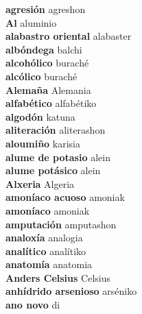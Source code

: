 \textbf{ agresión  } agreshon \\
\textbf{ Al  } aluminio \\
\textbf{ alabastro oriental  } alabaster \\
\textbf{ albóndega  } balchi \\
\textbf{ alcohólico  } buraché \\
\textbf{ alcólico  } buraché \\
\textbf{ Alemaña  } Alemania \\
\textbf{ alfabético  } alfabétiko \\
\textbf{ algodón  } katuna \\
\textbf{ aliteración  } aliterashon \\
\textbf{ aloumiño  } karisia \\
\textbf{ alume de potasio  } alein \\
\textbf{ alume potásico  } alein \\
\textbf{ Alxeria  } Algeria \\
\textbf{ amoníaco acuoso  } amoniak \\
\textbf{ amoníaco  } amoniak \\
\textbf{ amputación  } amputashon \\
\textbf{ analoxía  } analogia \\
\textbf{ analítico  } analítiko \\
\textbf{ anatomía  } anatomia \\
\textbf{ Anders Celsius  } Celsius \\
\textbf{ anhídrido arsenioso  } arséniko \\
\textbf{ ano novo  } di \\
